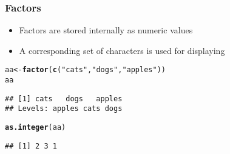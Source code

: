 \documentclass[paper=screen,mathserif]{beamer}\usepackage[]{graphicx}\usepackage[]{color}
\makeatletter
\newcommand{\hlstr}[1]{\textcolor[rgb]{0.192,0.494,0.8}{#1}}%
\newcommand{\hlstd}[1]{\textcolor[rgb]{0.345,0.345,0.345}{#1}}%
\newcommand{\hlkwb}[1]{\textcolor[rgb]{0.69,0.353,0.396}{#1}}%
\newcommand{\hlkwd}[1]{\textcolor[rgb]{0.737,0.353,0.396}{\textbf{#1}}}%
\newenvironment{kframe}{%
 \def\at@end@of@kframe{}%
 \ifinner\ifhmode%
  \def\at@end@of@kframe{\end{minipage}}%
  \begin{minipage}{\columnwidth}%
 \fi\fi%
 \def\FrameCommand##1{\hskip\@totalleftmargin \hskip-\fboxsep
 \colorbox{shadecolor}{##1}\hskip-\fboxsep
     \hskip-\linewidth \hskip-\@totalleftmargin \hskip\columnwidth}%
 \MakeFramed {\advance\hsize-\width
   \@totalleftmargin\z@ \linewidth\hsize
   \@setminipage}}%
 {\par\unskip\endMakeFramed%
 \at@end@of@kframe}
\newenvironment{knitrout}{}{} %
\newcommand{\ft}[1]{\frametitle{#1}}
\makeatother
\begin{document}
\begin{frame}[fragile]
  \ft{Factors}
  \begin{itemize}
  \item Factors are stored internally as numeric values

  \item A corresponding set of characters is used for displaying
  \end{itemize}
\begin{knitrout}\scriptsize
{}\color{fgcolor}\begin{kframe}
\begin{alltt}
\hlstd{aa} \hlkwb{<-} \hlkwd{factor}\hlstd{(}\hlkwd{c}\hlstd{(}\hlstr{"cats"}\hlstd{,} \hlstr{"dogs"}\hlstd{,} \hlstr{"apples"}\hlstd{))}
\hlstd{aa}
\end{alltt}
\begin{verbatim}
## [1] cats   dogs   apples
## Levels: apples cats dogs
\end{verbatim}
\begin{alltt}
\hlkwd{as.integer}\hlstd{(aa)}
\end{alltt}
\begin{verbatim}
## [1] 2 3 1
\end{verbatim}
\end{kframe}
\end{knitrout}
\end{frame}
\end{document}
